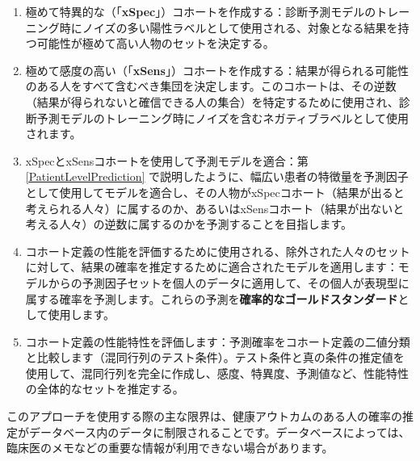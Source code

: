 \documentclass[
  11pt]{book}
\theoremstyle{definition}
\theoremstyle{definition}
\theoremstyle{definition}
\theoremstyle{definition}
\theoremstyle{remark}
\begin{document}
\begin{enumerate}
\def\labelenumi{\arabic{enumi}.}
\item
  極めて特異的な（「\textbf{xSpec}」）コホートを作成する：診断予測モデルのトレーニング時にノイズの多い陽性ラベルとして使用される、対象となる結果を持つ可能性が極めて高い人物のセットを決定する。
\item
  極めて感度の高い（「\textbf{xSens}」）コホートを作成する：結果が得られる可能性のある人をすべて含むべき集団を決定します。このコホートは、その逆数（結果が得られないと確信できる人の集合）を特定するために使用され、診断予測モデルのトレーニング時にノイズを含むネガティブラベルとして使用されます。
\item
  xSpecとxSensコホートを使用して予測モデルを適合：第 \ref{PatientLevelPrediction} で説明したように、幅広い患者の特徴量を予測因子として使用してモデルを適合し、その人物がxSpecコホート（結果が出ると考えられる人々）に属するのか、あるいはxSensコホート（結果が出ないと考える人々）の逆数に属するのかを予測することを目指します。
\item
  コホート定義の性能を評価するために使用される、除外された人々のセットに対して、結果の確率を推定するために適合されたモデルを適用します：モデルからの予測因子セットを個人のデータに適用して、その個人が表現型に属する確率を予測します。これらの予測を\textbf{確率的なゴールドスタンダード}として使用します。
\item
  コホート定義の性能特性を評価します：予測確率をコホート定義の二値分類と比較します（混同行列のテスト条件）。テスト条件と真の条件の推定値を使用して、混同行列を完全に作成し、感度、特異度、予測値など、性能特性の全体的なセットを推定する。
\end{enumerate}

このアプローチを使用する際の主な限界は、健康アウトカムのある人の確率の推定がデータベース内のデータに制限されることです。データベースによっては、臨床医のメモなどの重要な情報が利用できない場合があります。
\end{document}
